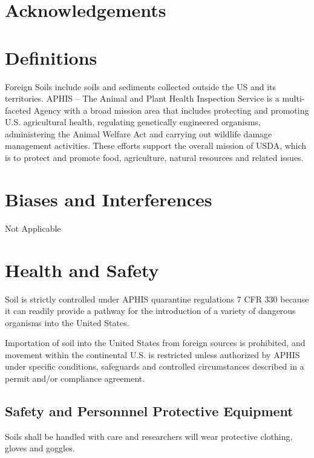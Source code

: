 \documentclass[12pt]{../SOP3}\usepackage[]{graphicx}\usepackage[]{color}
\begin{document}
\tableofcontents

\newpage

\section{Acknowledgements}

\section{Definitions}

\NP Foreign Soils include soils and sediments collected outside the US and its territories. 
\NP APHIS -- The Animal and Plant Health Inspection Service is a multi-faceted Agency with a broad mission area that includes protecting and promoting U.S. agricultural health, regulating genetically engineered organisms, administering the Animal Welfare Act and carrying out wildlife damage management activities. These efforts support the overall mission of USDA, which is to protect and promote food, agriculture, natural resources and related issues.

\section{Biases and Interferences}

\NP Not Applicable

\section{Health and Safety}

\NP Soil is strictly controlled under APHIS quarantine regulations 7 CFR 330 because it can readily provide a pathway for the introduction of a variety of dangerous organisms into the United States.

\NP Importation of soil into the United States from foreign sources is prohibited, and movement within the continental U.S. is restricted unless authorized by APHIS under specific conditions, safeguards and controlled circumstances described in a permit and/or compliance agreement.


\subsection{Safety and Personnnel Protective Equipment}

\NP Soils shall be handled with care and researchers will wear protective clothing, gloves and goggles. 
\end{document}
